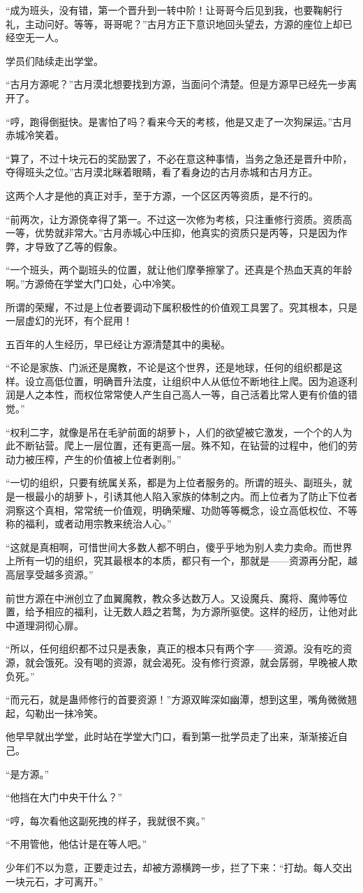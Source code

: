 \begin{this_body}
“成为班头，没有错，第一个晋升到一转中阶！让哥哥今后见到我，也要鞠躬行礼，主动问好。等等，哥哥呢？”古月方正下意识地回头望去，方源的座位上却已经空无一人。

学员们陆续走出学堂。

“古月方源呢？”古月漠北想要找到方源，当面问个清楚。但是方源早已经先一步离开了。

“哼，跑得倒挺快。是害怕了吗？看来今天的考核，他是又走了一次狗屎运。”古月赤城冷笑着。

“算了，不过十块元石的奖励罢了，不必在意这种事情，当务之急还是晋升中阶，夺得班头之位。”古月漠北眯着眼睛，看了看身边的古月赤城和古月方正。

这两个人才是他的真正对手，至于方源，一个区区丙等资质，是不行的。

“前两次，让方源侥幸得了第一。不过这一次修为考核，只注重修行资质。资质高一等，优势就非常大。”古月赤城心中压抑，他真实的资质只是丙等，只是因为作弊，才导致了乙等的假象。

“一个班头，两个副班头的位置，就让他们摩拳擦掌了。还真是个热血天真的年龄啊。”方源倚在学堂大门口处，心中冷笑。

所谓的荣耀，不过是上位者要调动下属积极性的价值观工具罢了。究其根本，只是一层虚幻的光环，有个屁用！

五百年的人生经历，早已经让方源清楚其中的奥秘。

“不论是家族、门派还是魔教，不论是这个世界，还是地球，任何的组织都是这样。设立高低位置，明确晋升法度，让组织中人从低位不断地往上爬。因为追逐利润是人之本性，而权位常常使人产生自己高人一等，自己活着比常人更有价值的错觉。”

“权利二字，就像是吊在毛驴前面的胡萝卜，人们的欲望被它激发，一个个的人为此不断钻营。爬上一层位置，还有更高一层。殊不知，在钻营的过程中，他们的劳动力被压榨，产生的价值被上位者剥削。”

“一切的组织，只要有统属关系，都是为上位者服务的。所谓的班头、副班头，就是一根最小的胡萝卜，引诱其他人陷入家族的体制之内。而上位者为了防止下位者洞察这个真相，常常统一价值观，明确荣耀、功勋等等概念，设立高低权位、不等称的福利，或者动用宗教来统治人心。”

“这就是真相啊，可惜世间大多数人都不明白，傻乎乎地为别人卖力卖命。而世界上所有一切的组织，究其最根本的本质，都只有一个，那就是——资源再分配，越高层享受越多资源。”

前世方源在中洲创立了血翼魔教，教众多达数万人。又设魔兵、魔将、魔帅等位置，给予相应的福利，让无数人趋之若鹜，为方源所驱使。这样的经历，让他对此中道理洞彻心扉。

“所以，任何组织都不过只是表象，真正的根本只有两个字——资源。没有吃的资源，就会饿死。没有喝的资源，就会渴死。没有修行资源，就会孱弱，早晚被人欺负死。”

“而元石，就是蛊师修行的首要资源！”方源双眸深如幽潭，想到这里，嘴角微微翘起，勾勒出一抹冷笑。

他早早就出学堂，此时站在学堂大门口，看到第一批学员走了出来，渐渐接近自己。

“是方源。”

“他挡在大门中央干什么？”

“哼，每次看他这副死拽的样子，我就很不爽。”

“不用管他，他估计是在等人吧。”

少年们不以为意，正要走过去，却被方源横跨一步，拦了下来：“打劫。每人交出一块元石，才可离开。”

\end{this_body}

